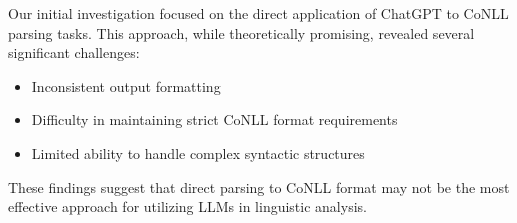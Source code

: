 Our initial investigation focused on the direct application of ChatGPT to CoNLL parsing tasks. This approach, while theoretically promising, revealed several significant challenges:

\begin{itemize}
    \item Inconsistent output formatting
    \item Difficulty in maintaining strict CoNLL format requirements
    \item Limited ability to handle complex syntactic structures
\end{itemize}

These findings suggest that direct parsing to CoNLL format may not be the most effective approach for utilizing LLMs in linguistic analysis. 